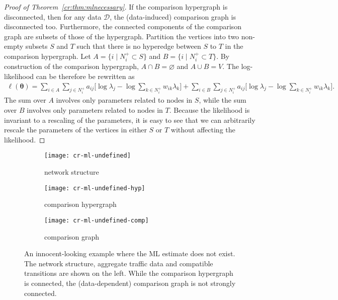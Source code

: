 \begin{proof}[Proof of Theorem~\ref{cr:thm:mlnecessary}]
If the comparison hypergraph is disconnected, then for any data $\mathcal{D}$, the (data-induced) comparison graph is disconnected too.
Furthermore, the connected components of the comparison graph are subsets of those of the hypergraph.
Partition the vertices into two non-empty subsets $S$ and $T$ such that there is no hyperedge between $S$ to $T$ in the comparison hypergraph.
Let $A = \{ i \mid N^+_i \subset S \}$ and $B = \{ i \mid N^+_i \subset T \}$.
By construction of the comparison hypergraph, $A \cap B = \varnothing$ and $A \cup B = V$.
The log-likelihood can be therefore be rewritten as
\begin{align*}
\ell(\bm{\theta}) =
    \sum_{i \in A} \sum_{j \in N^+_i} a_{ij} \bigg[ \log \lambda_j - \log \sum_{k \in N^+_i} w_{ik} \lambda_k \bigg]
    + \sum_{i \in B} \sum_{j \in N^+_i} a_{ij} \bigg[ \log \lambda_j - \log \sum_{k \in N^+_i} w_{ik} \lambda_k \bigg].
\end{align*}
The sum over $A$ involves only parameters related to nodes in $S$, while the sum over $B$ involves only parameters related to nodes in $T$.
Because the likelihood is invariant to a rescaling of the parameters, it is easy to see that we can arbitrarily rescale the parameters of the vertices in either $S$ or $T$ without affecting the likelihood.
\end{proof}

\begin{figure*}[t]
  \begin{subfigure}{.33\textwidth}
    \centering
    \texttt{[image: cr-ml-undefined]}
    \caption{network structure}
  \end{subfigure}%
  \begin{subfigure}{.33\textwidth}
    \centering
    \texttt{[image: cr-ml-undefined-hyp]}
    \caption{comparison hypergraph}
  \end{subfigure}
  \begin{subfigure}{.33\textwidth}
    \centering
    \texttt{[image: cr-ml-undefined-comp]}
    \caption{comparison graph}
  \end{subfigure}
  \caption{An innocent-looking example where the ML estimate does not exist.
  The network structure, aggregate traffic data and compatible transitions are shown on the left.
  While the comparison hypergraph is connected, the (data-dependent) comparison graph is not strongly connected.}
  \label{cr:fig:badexample}
\end{figure*}

